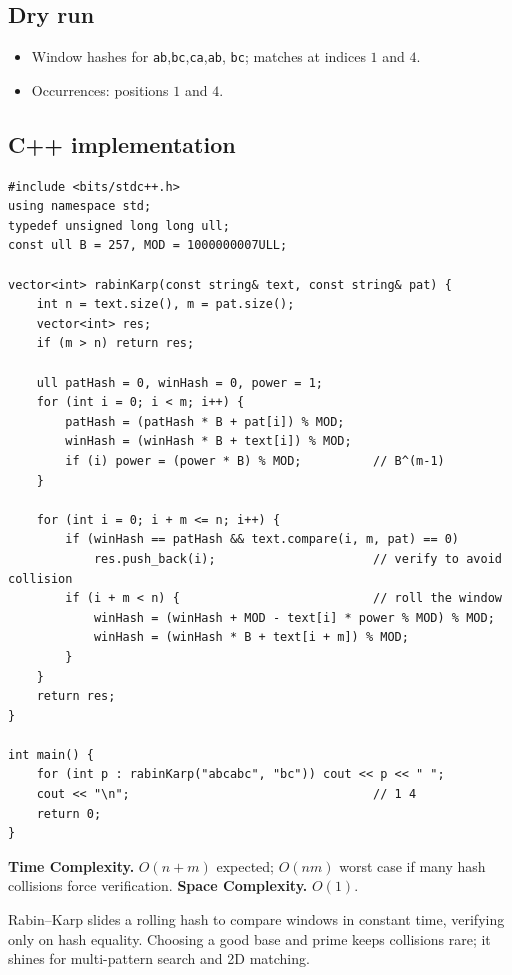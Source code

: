 \subsection*{Dry run}


\begin{itemize}
  \item Window hashes for \texttt{ab},\texttt{bc},\texttt{ca},\texttt{ab},
        \texttt{bc}; matches at indices $1$ and $4$.
  \item Occurrences: positions $1$ and $4$.
\end{itemize}

\subsection*{C++ implementation}

\begin{lstlisting}
#include <bits/stdc++.h>
using namespace std;
typedef unsigned long long ull;
const ull B = 257, MOD = 1000000007ULL;

vector<int> rabinKarp(const string& text, const string& pat) {
    int n = text.size(), m = pat.size();
    vector<int> res;
    if (m > n) return res;

    ull patHash = 0, winHash = 0, power = 1;
    for (int i = 0; i < m; i++) {
        patHash = (patHash * B + pat[i]) % MOD;
        winHash = (winHash * B + text[i]) % MOD;
        if (i) power = (power * B) % MOD;          // B^(m-1)
    }

    for (int i = 0; i + m <= n; i++) {
        if (winHash == patHash && text.compare(i, m, pat) == 0)
            res.push_back(i);                      // verify to avoid collision
        if (i + m < n) {                           // roll the window
            winHash = (winHash + MOD - text[i] * power % MOD) % MOD;
            winHash = (winHash * B + text[i + m]) % MOD;
        }
    }
    return res;
}

int main() {
    for (int p : rabinKarp("abcabc", "bc")) cout << p << " ";
    cout << "\n";                                  // 1 4
    return 0;
}
\end{lstlisting}

\begin{complexitybox}
\textbf{Time Complexity.} $O(n+m)$ expected; $O(nm)$ worst case if many hash
collisions force verification. \textbf{Space Complexity.} $O(1)$.
\end{complexitybox}

\begin{takeawaybox}
Rabin--Karp slides a rolling hash to compare windows in constant time,
verifying only on hash equality. Choosing a good base and prime keeps
collisions rare; it shines for multi-pattern search and 2D matching.
\end{takeawaybox}
